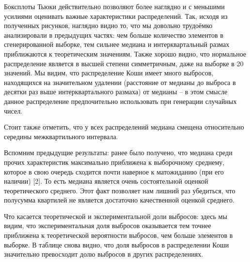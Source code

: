 Боксплоты Тьюки действительно позволяют более наглядно и с меньшими усилиями оценивать важные характеристики распределений. Так, исходя из полученных рисунков, наглядно видно то, что мы довольно трудоёмко анализировали в предыдущих частях: чем больше количество элементов в сгенерированной выборке, тем сильнее медиана и интерквартальный размах приближаются к теоретическим значениям. Также хорошо видно, что нормальное распределение является в высшей степени симметричным, даже на выборке в 20 значений. Мы видим, что распределение Коши имеет много выбросов, находящихся на значительном удалении (расстояние от медианы до выброса в десятки раз выше интерквартального размаха) от медианы -- в этом смысле данное распределение предпочительно использовать при генерации случайных чисел.

Стоит также отметить, что у всех распределений медиана смещена относительно середины межквартильного интервала. 

Вспомним предыдущие результаты: ранее было получено, что медиана среди прочих характеристик максимально приближена к выборочному среднему, которое в свою очередь сходится почти наверное к матожиданию (при его наличии) [2]. То есть медиана является очень состоятельной оценкой теоретического среднего. Этот факт позволяет нам лишний раз убедиться, что полусумма квартилей не является достаточно качественной оценкой среднего.

Что касается теоретической и экспериментальной доли выбросов: здесь мы видим, что экспериментальная доля выбросов оказывается тем точнее приближена к теоретической вероятности выбросов, чем больше элементов в выборке. В таблице снова видно, что доля выбросов в распределении Коши значительно превосходит долю выбросов в других распределениях.
